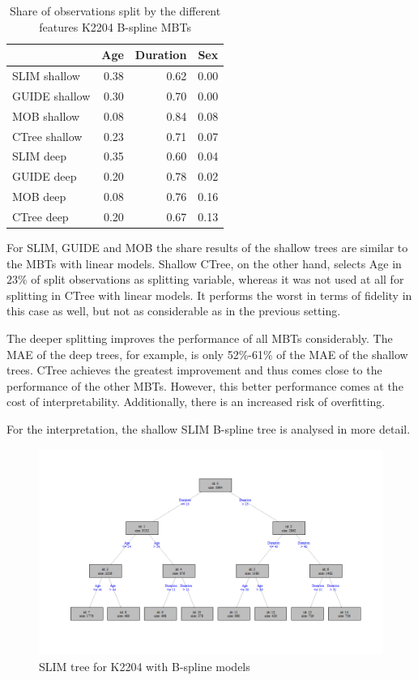 \begin{table}[!htb]
\caption{Share of observations split by the different features K2204 B-spline MBTs}
\centering \small
\begin{tabular}[t]{l|r|r|r}
\hline
  & Age & Duration & Sex\\
\hline
SLIM shallow & 0.38 & 0.62 & 0.00\\
GUIDE shallow & 0.30 & 0.70 & 0.00\\
MOB shallow & 0.08 & 0.84 & 0.08\\
CTree shallow & 0.23 & 0.71 & 0.07\\
\hline
SLIM deep & 0.35 & 0.60 & 0.04\\
GUIDE deep & 0.20 & 0.78 & 0.02\\
MOB deep & 0.08 & 0.76 & 0.16\\
CTree deep & 0.20 & 0.67 & 0.13\\
\hline
\end{tabular}
\label{tab:ins_k2204_bsplines_surrogates_share}
\end{table}

For SLIM, GUIDE and MOB the share results of the shallow trees are similar to the MBTs with linear models. Shallow CTree, on the other hand, selects Age in $23\%$ of split observations as splitting variable, whereas it was not used at all for splitting in CTree with linear models. It performs the worst in terms of fidelity in this case as well, but not as considerable as in the previous setting.

The deeper splitting improves the performance of all MBTs considerably. The MAE of the deep trees, for example, is only 52\%-61\% of the MAE of the shallow trees. CTree achieves the greatest improvement and thus comes close to the performance of the other MBTs. However, this better performance comes at the cost of interpretability. Additionally, there is an increased risk of overfitting.



For the interpretation, the shallow SLIM B-spline tree is analysed in more detail.

\begin{figure}[!htb]
    \centering   
    \includegraphics[width = 16cm]{Figures/insurance_use_case/k2204_BPV/slim_bsplines_small_tree.png}
         \caption{SLIM tree for K2204 with B-spline models}
     \label{fig:ins_slim_bsplines_tree}
\end{figure}

